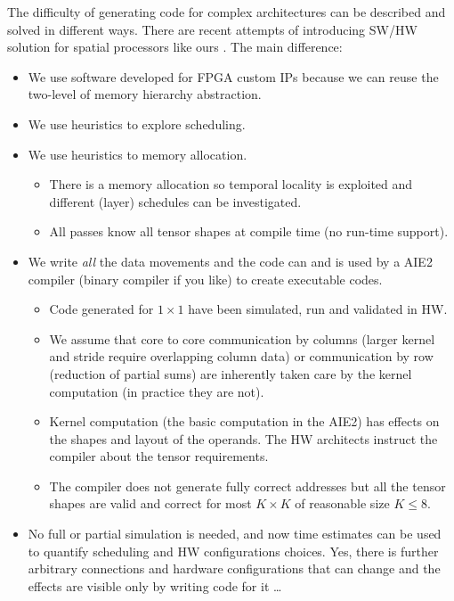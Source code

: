 \documentclass[conference]{IEEEtran}
\begin{document}
The difficulty of generating code for complex architectures can be
described and solved in different ways. There are recent attempts of
introducing SW/HW solution for spatial processors like ours
\cite{Huang2021CoSASB,Russo2023MemoryAwareDA,Cai2023InterlayerSS}. The
main difference:
\begin{itemize}
   \item We use software developed for FPGA custom IPs because we can
     reuse the two-level of memory hierarchy abstraction.
   \item We use heuristics to explore scheduling.
   \item We use heuristics to memory allocation.
     \begin{itemize}
     \item There is a memory allocation so temporal locality is
       exploited and different (layer) schedules can be investigated.
     \item All passes know all tensor shapes at compile time (no
       run-time support).
     \end{itemize}
   \item We write {\em all} the data movements and the code can and is
     used by a AIE2 compiler (binary compiler if you like) to create
     executable codes.
     \begin{itemize}
     \item Code generated for $1\times 1$ have been simulated, run and
       validated in HW.
     \item We assume that core to core communication by columns
       (larger kernel and stride require overlapping column data) or
       communication by row (reduction of partial sums) are inherently
       taken care by the kernel computation (in practice they are
       not).
     \item Kernel computation (the basic computation in the AIE2) has
       effects on the shapes and layout of the operands. The HW
       architects instruct the compiler about the tensor requirements.
     \item The compiler does not generate fully correct addresses but
       all the tensor shapes are valid and correct for most $K\times
       K$ of reasonable size $K\leq 8$.
     \end{itemize}
   \item No full or partial simulation is needed, and now time
     estimates can be used to quantify scheduling and HW
     configurations choices. Yes, there is further arbitrary
     connections and hardware configurations that can change and the
     effects are visible only by writing code for it \dots
\end{itemize}
\end{document}
